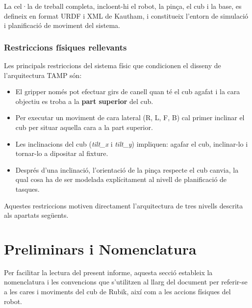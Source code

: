 \documentclass[12pt, a4paper]{article}
\begin{document}
La cel·la de treball completa, incloent-hi el robot, la pinça, el cub i la base, es defineix en format URDF i XML de Kautham, i constitueix l'entorn de simulació i planificació de moviment del sistema.

\subsubsection{Restriccions físiques rellevants}

Les principals restriccions del sistema físic que condicionen el disseny de l'arquitectura TAMP són:

\begin{itemize}[leftmargin=2em]
  \item El gripper només pot efectuar girs de canell quan té el cub agafat i la cara objectiu es troba a la \textbf{part superior} del cub.
  \item Per executar un moviment de cara lateral (R, L, F, B) cal primer inclinar el cub per situar aquella cara a la part superior.
  \item Les inclinacions del cub (\textit{tilt\_x} i \textit{tilt\_y}) impliquen: agafar el cub, inclinar-lo i tornar-lo a dipositar al fixture.
  \item Després d'una inclinació, l'orientació de la pinça respecte el cub canvia, la qual cosa ha de ser modelada explícitament al nivell de planificació de tasques.
\end{itemize}

Aquestes restriccions motiven directament l'arquitectura de tres nivells descrita als apartats següents.


\section{Preliminars i Nomenclatura}

Per facilitar la lectura del present informe, aquesta secció estableix la nomenclatura i les convencions que s'utilitzen al llarg del document per referir-se a les cares i moviments del cub de Rubik, així com a les accions físiques del robot.

\newcommand{\imgplaceholder}[3][8cm]{%
  \begin{figure}[H]
    \centering
    \fbox{\begin{minipage}{#1}\centering\vspace{1.2cm}
      {\large\textit{[Foto: #2]}}
      \vspace{1.2cm}
    \end{minipage}}
    \caption{#3}
  \end{figure}
}
\end{document}
